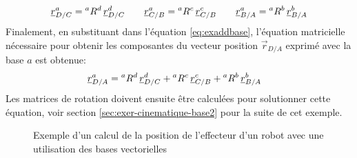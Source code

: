 \begin{align}
\underline{r}_{D/C}^a = {}^aR^d \, \underline{r}_{D/C}^d 
\quad \quad
\underline{r}_{C/B}^a = {}^aR^c \, \underline{r}_{C/B}^c
\quad \quad
\underline{r}_{B/A}^a = {}^aR^b \, \underline{r}_{B/A}^b
\end{align} 
Finalement, en substituant dans l'équation \eqref{eq:exaddbase}, l'équation matricielle nécessaire pour obtenir les composantes du vecteur position $\vec{r}_{D/A}$ exprimé avec la base $a$ est obtenue:
\begin{align}
\underline{r}_{D/A}^a &= {}^aR^d \, \underline{r}_{D/C}^d + {}^aR^c \, \underline{r}_{C/B}^c + {}^aR^b \, \underline{r}_{B/A}^b
\label{eq:ex333cinematique}
\end{align} 
Les matrices de rotation doivent ensuite être calculées pour solutionner cette équation, voir section \ref{sec:exer-cinematique-base2} pour la suite de cet exemple. 
\begin{figure}[htb]
        \centering
				\hspace{10pt}
        \caption{Exemple d'un calcul de la position de l'effecteur d'un robot avec une utilisation des bases vectorielles}
				\label{fig:vecposbase}
\end{figure}


